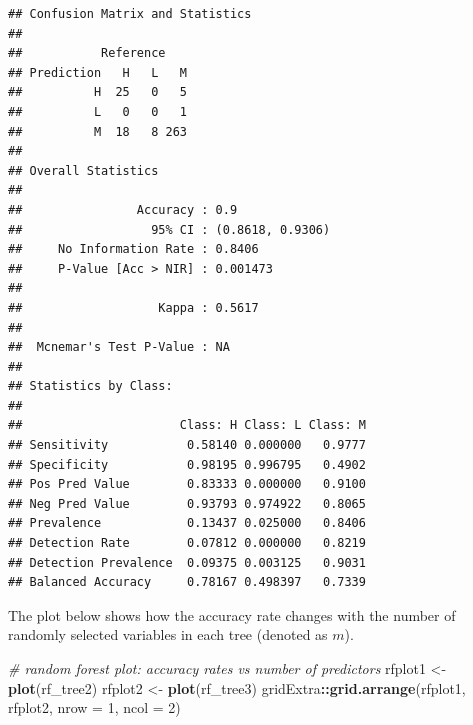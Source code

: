 \documentclass[
]{book}
\newenvironment{Shaded}{\begin{snugshade}}{\end{snugshade}}
\newcommand{\AttributeTok}[1]{\textcolor[rgb]{0.13,0.29,0.53}{#1}}
\newcommand{\CommentTok}[1]{\textcolor[rgb]{0.56,0.35,0.01}{\textit{#1}}}
\newcommand{\DecValTok}[1]{\textcolor[rgb]{0.00,0.00,0.81}{#1}}
\newcommand{\FunctionTok}[1]{\textcolor[rgb]{0.13,0.29,0.53}{\textbf{#1}}}
\newcommand{\NormalTok}[1]{#1}
\newcommand{\OtherTok}[1]{\textcolor[rgb]{0.56,0.35,0.01}{#1}}
\newcommand{\SpecialCharTok}[1]{\textcolor[rgb]{0.81,0.36,0.00}{\textbf{#1}}}
\begin{document}
\begin{Shaded}
\end{Shaded}

\begin{verbatim}
## Confusion Matrix and Statistics
## 
##           Reference
## Prediction   H   L   M
##          H  25   0   5
##          L   0   0   1
##          M  18   8 263
## 
## Overall Statistics
##                                           
##                Accuracy : 0.9             
##                  95% CI : (0.8618, 0.9306)
##     No Information Rate : 0.8406          
##     P-Value [Acc > NIR] : 0.001473        
##                                           
##                   Kappa : 0.5617          
##                                           
##  Mcnemar's Test P-Value : NA              
## 
## Statistics by Class:
## 
##                      Class: H Class: L Class: M
## Sensitivity           0.58140 0.000000   0.9777
## Specificity           0.98195 0.996795   0.4902
## Pos Pred Value        0.83333 0.000000   0.9100
## Neg Pred Value        0.93793 0.974922   0.8065
## Prevalence            0.13437 0.025000   0.8406
## Detection Rate        0.07812 0.000000   0.8219
## Detection Prevalence  0.09375 0.003125   0.9031
## Balanced Accuracy     0.78167 0.498397   0.7339
\end{verbatim}

The plot below shows how the accuracy rate changes with the number of randomly selected variables in each tree (denoted as \(m\)).

\begin{Shaded}
\begin{Highlighting}[]
\CommentTok{\# random forest plot: accuracy rates vs number of predictors}
\NormalTok{rfplot1 }\OtherTok{\textless{}{-}} \FunctionTok{plot}\NormalTok{(rf\_tree2)}
\NormalTok{rfplot2 }\OtherTok{\textless{}{-}} \FunctionTok{plot}\NormalTok{(rf\_tree3)}
\NormalTok{gridExtra}\SpecialCharTok{::}\FunctionTok{grid.arrange}\NormalTok{(rfplot1, rfplot2, }\AttributeTok{nrow =} \DecValTok{1}\NormalTok{, }\AttributeTok{ncol =} \DecValTok{2}\NormalTok{)}
\end{Highlighting}
\end{Shaded}
\end{document}
